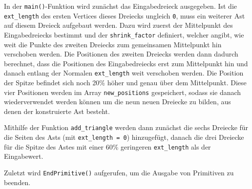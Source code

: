 In der \lstinline{main()}-Funktion wird zunächst das Eingabedreieck ausgegeben. Ist die \lstinline{ext_length} des ersten Vertices dieses Dreiecks ungleich \lstinline{0}, muss ein weiterer Ast auf diesem Dreieck aufgebaut werden. Dazu wird zuerst der Mittelpunkt des Eingabedreiecks bestimmt und der \lstinline{shrink_factor} definiert, welcher angibt, wie weit die Punkte des zweiten Dreiecks zum gemeinsamen Mittelpunkt hin verschoben werden. Die Positionen des zweiten Dreiecks werden dann dadurch berechnet, dass die Positionen des Eingabedreiecks erst zum Mittelpunkt hin und danach entlang der Normalen \lstinline{ext_length} weit verschoben werden. Die Position der Spitze befindet sich noch 20\% höher und genau über dem Mittelpunkt. Diese vier Positionen werden im Array \lstinline{new_positions} gespeichert, sodass sie danach wiederverwendet werden können um die neun neuen Dreiecke zu bilden, aus denen der konstruierte Ast besteht. 

Mithilfe der Funktion \lstinline{add_triangle} werden dann zunächst die sechs Dreiecke für die Seiten des Asts (mit \lstinline{ext_length = 0}) hinzugefügt, danach die drei Dreiecke für die Spitze des Astes mit einer 60\% geringeren \lstinline{ext_length} als der Eingabewert. 

Zuletzt wird \lstinline{EndPrimitive()} aufgerufen, um die Ausgabe von Primitiven zu beenden.




